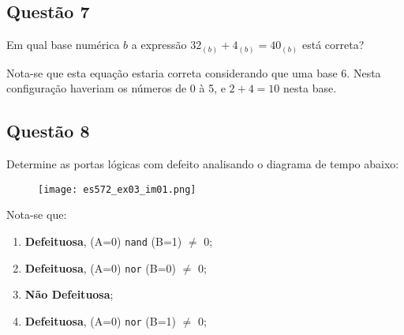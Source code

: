 \documentclass{article}
\begin{document}
        \subsection{Questão 7}
            \begin{exercise}
                Em qual base numérica $b$ a expressão $32_{(b)} + 4_{(b)} = 40_{(b)}$ está correta?
            \end{exercise}
            \begin{resolution}
                Nota-se que esta equação estaria correta considerando que uma base 6. Nesta configuração haveriam os números de 0 à 5, e $2+4 = 10$ nesta base.
            \end{resolution}
\newpage

        \subsection{Questão 8}
            \begin{exercise}
                Determine as portas lógicas com defeito analisando o diagrama de tempo abaixo:
                    \begin{figure}[H]
                        \centering
                        \texttt{[image: es572\_ex03\_im01.png]}
                    \end{figure} \noindent
            \end{exercise}
            \begin{resolution}
                Nota-se que:
                    \begin{enumerate}
                        \item \textbf{Defeituosa}, (A=0) \texttt{nand} (B=1) $\ne$ 0;

                        \item \textbf{Defeituosa}, (A=0) \texttt{nor} (B=0) $\ne$ 0;

                        \item \textbf{Não Defeituosa};

                        \item \textbf{Defeituosa}, (A=0) \texttt{nor} (B=1) $\ne$ 0;
                    \end{enumerate}
            \end{resolution}
\end{document}
